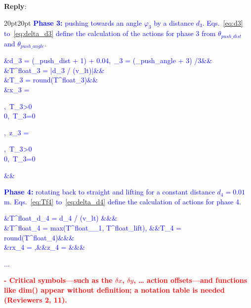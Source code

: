 \documentclass[11pt]{article}
\newenvironment{reply}
   {\medskip \noindent \begin{sf}\textbf{Reply}: \  }
   {\medskip \end{sf}}
\newcommand{\rv}[1]{\textcolor{red}{#1}}
\newcommand{\xt}[1]{\textcolor{blue}{#1}}
\begin{document}
\begin{reply}
\begin{adjustwidth}{20pt}{20pt}
\xt{\textbf{Phase 3:} pushing towards an angle $\varphi_3$ by a distance $d_3$. Eqs.~\ref{eq:d3} to~\ref{eq:delta_d3} define the calculation of the actions for phase 3 from $\theta_{push\_dist}$ and $\theta_{push\_angle}$}.
\begingroup\makeatletter\def\f@size{8}\check@mathfonts\xt{\vspace{-0.3cm}
\begin{flalign}
    &d_3 = (\theta_{push\_dist} + 1) \cdot 0.1 + 0.04,\ \varphi_3 = (\theta_{push\_angle} + 3) \cdot \pi /3\hspace{-0.4cm}&&\label{eq:d3}\\
    &T^{float}_3 = |d_3 / (v_l\cdot\Delta t)|&&\label{eq:Tf3}\\
    &T_3 = round(T^{float}_3)&&\label{eq:Ti3}\\
    &\Delta x_3 = \begin{cases}
        \frac{d_3 \cdot \cos(\varphi_3)}{T_3},\ T_3>0\\
        0,\  T_3=0
        \end{cases},\
    \Delta z_3 = \begin{cases}
        \frac{d_3 \cdot \sin(\varphi_3)}{T_3},\ T_3>0\\
        0,\  T_3=0
        \end{cases}\hspace{-1cm}&&\label{eq:delta_d3}
\end{flalign}}
\endgroup

\xt{\textbf{Phase 4:} rotating back to straight and lifting for a constant distance $d_4=0.01$ m. Eqs.~\ref{eq:Tf4} to~\ref{eq:delta_d4} define the calculation of actions for phase 4.}
\begingroup\makeatletter\def\f@size{8}\check@mathfonts\xt{\vspace{-0.3cm}
\begin{flalign}
    &T^{float}_{d_4} = d_4 / (v_l\cdot\Delta t) &&&\label{eq:Tf4}\\
    &T^{float}_4 = max(T^{float}_{\varphi_1}, T^{float}_{lift}), &&T_4 = round(T^{float}_4)&&&\label{eq:Ti4}\\
    &\Delta rx_4 = \frac{- \varphi_1}{T_4},&&\Delta z_4 = \frac{d_4}{T_4}&&&\label{eq:delta_d4}
\end{flalign}}
\endgroup

\xt{...}

\end{adjustwidth}

\vspace{0.3cm}\noindent\rv{\textbf{- Critical symbols—such as the $\delta x$, $\delta y$, … action offsets—and functions like dim() appear without definition; a notation table is needed (Reviewers 2, 11).}}


\end{reply}
\end{document}
